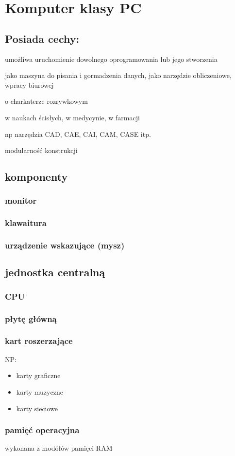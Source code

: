 \documentclass[11pt]{article}
\begin{document}
\section{Komputer klasy PC}
\label{sec:org93e6e85}
\subsection{Posiada cechy:}
\label{sec:orga28d635}
\begin{description}
\item[{porgramowalność}] umożliwa uruchomienie dowolnego oprogramowania lub jego stworzenia
\item[{uniwersalne zastosowania}] \begin{description}
\item[{typowo użytkowe}] jako maszyna do pisania i gormadzenia danych, jako narzędzie obliczeniowe, wpracy biurowej
\item o charkaterze rozrywkowym
\item[{badawczo-naukowe}] w naukach ścisłych, w medycynie, w farmacji
\item[{wspomagające projektowanie}] np narzędzia CAD, CAE, CAI, CAM, CASE itp.
\end{description}
\item modularność konstrukcji
\end{description}
\subsection{komponenty}
\label{sec:orgccd3834}
\subsubsection{monitor}
\label{sec:org3813264}
\subsubsection{klawaitura}
\label{sec:org0656c19}
\subsubsection{urządzenie wskazujące (mysz)}
\label{sec:orgeb59486}
\subsection{jednostka centralną}
\label{sec:orgbf763ca}
\subsubsection{CPU}
\label{sec:org4b0692b}
\subsubsection{płytę główną}
\label{sec:orgb95b92c}
\subsubsection{kart roszerzające}
\label{sec:org9473336}
NP:
\begin{itemize}
\item karty graficzne
\item karty muzyczne
\item karty sieciowe
\end{itemize}
\subsubsection{pamięć operacyjna}
\label{sec:org1746c77}
wykonana z modółów pamięci RAM
\end{document}
